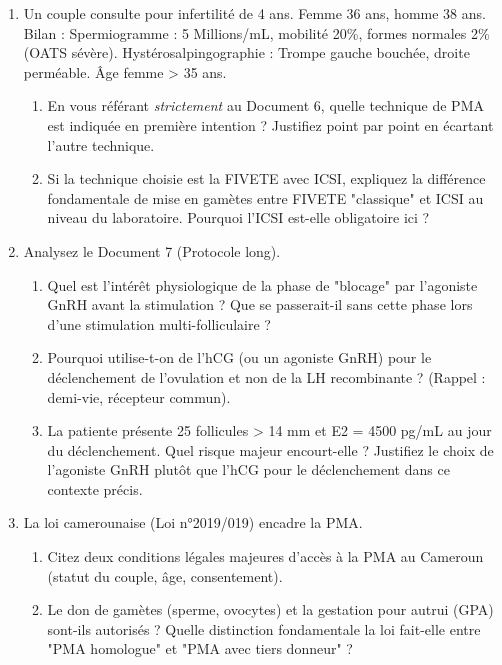 \documentclass[11pt]{article}
\begin{document}
\begin{exercice}
\begin{enumerate}
\item Un couple consulte pour infertilité de 4 ans. Femme 36 ans, homme 38 ans. Bilan : Spermiogramme : 5 Millions/mL, mobilité 20\%, formes normales 2\% (OATS sévère). Hystérosalpingographie : Trompe gauche bouchée, droite perméable. Âge femme > 35 ans.
      \begin{enumerate}
      \item En vous référant \textit{strictement} au Document 6, quelle technique de PMA est indiquée en première intention ? Justifiez point par point en écartant l'autre technique.
      \item Si la technique choisie est la FIVETE avec ICSI, expliquez la différence fondamentale de mise en gamètes entre FIVETE "classique" et ICSI au niveau du laboratoire. Pourquoi l'ICSI est-elle obligatoire ici ?
      \end{enumerate}
\item Analysez le Document 7 (Protocole long).
      \begin{enumerate}
      \item Quel est l'intérêt physiologique de la phase de "blocage" par l'agoniste GnRH avant la stimulation ? Que se passerait-il sans cette phase lors d'une stimulation multi-folliculaire ?
      \item Pourquoi utilise-t-on de l'hCG (ou un agoniste GnRH) pour le déclenchement de l'ovulation et non de la LH recombinante ? (Rappel : demi-vie, récepteur commun).
      \item La patiente présente 25 follicules > 14 mm et E2 = 4500 pg/mL au jour du déclenchement. Quel risque majeur encourt-elle ? Justifiez le choix de l'agoniste GnRH plutôt que l'hCG pour le déclenchement dans ce contexte précis.
      \end{enumerate}
\item La loi camerounaise (Loi n°2019/019) encadre la PMA.
      \begin{enumerate}
      \item Citez deux conditions légales majeures d'accès à la PMA au Cameroun (statut du couple, âge, consentement).
      \item Le don de gamètes (sperme, ovocytes) et la gestation pour autrui (GPA) sont-ils autorisés ? Quelle distinction fondamentale la loi fait-elle entre "PMA homologue" et "PMA avec tiers donneur" ?
      \end{enumerate}
\end{enumerate}
\end{exercice}
\end{document}
